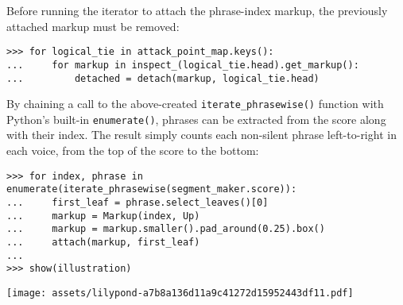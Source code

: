 \noindent Before running the iterator to attach the phrase-index markup, the
previously attached markup must be removed:

\begin{comment}
<abjad>[stylesheet=../consort.ily]
for logical_tie in attack_point_map.keys():
    for markup in inspect_(logical_tie.head).get_markup():
        detached = detach(markup, logical_tie.head)
</abjad>
\end{comment}

\begin{abjadbookoutput}
\begin{singlespacing}
\vspace{-0.5\baselineskip}
\begin{verbatim}
>>> for logical_tie in attack_point_map.keys():
...     for markup in inspect_(logical_tie.head).get_markup():
...         detached = detach(markup, logical_tie.head)
\end{verbatim}
\end{singlespacing}
\end{abjadbookoutput}

\noindent By chaining a call to the above-created
\texttt{iterate\_phrasewise()} function with Python's built-in
\texttt{enumerate()}, phrases can be extracted from the score along with their
index. The result simply counts each non-silent phrase left-to-right in each
voice, from the top of the score to the bottom:

\begin{comment}
<abjad>[stylesheet=../consort.ily]
for index, phrase in enumerate(iterate_phrasewise(segment_maker.score)):
    first_leaf = phrase.select_leaves()[0]
    markup = Markup(index, Up)
    markup = markup.smaller().pad_around(0.25).box()
    attach(markup, first_leaf)

show(illustration)
</abjad>
\end{comment}

\begin{abjadbookoutput}
\begin{singlespacing}
\vspace{-0.5\baselineskip}
\begin{verbatim}
>>> for index, phrase in enumerate(iterate_phrasewise(segment_maker.score)):
...     first_leaf = phrase.select_leaves()[0]
...     markup = Markup(index, Up)
...     markup = markup.smaller().pad_around(0.25).box()
...     attach(markup, first_leaf)
...
>>> show(illustration)
\end{verbatim}
\noindent\texttt{[image: assets/lilypond-a7b8a136d11a9c41272d15952443df11.pdf]}
\end{singlespacing}
\end{abjadbookoutput}

